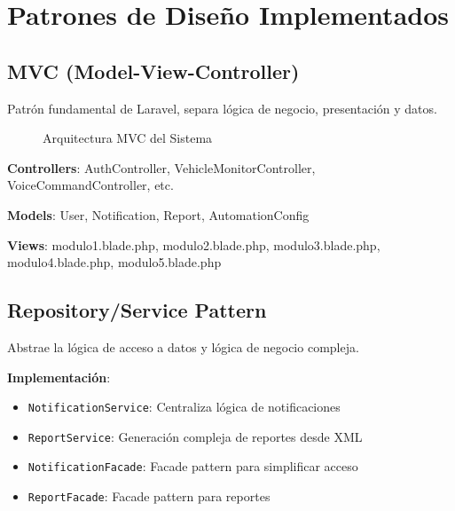 \newpage

\section{Patrones de Diseño Implementados}

\subsection{MVC (Model-View-Controller)}

Patrón fundamental de Laravel, separa lógica de negocio, presentación y datos.

\begin{figure}[H]
\centering
{}
\caption{Arquitectura MVC del Sistema}
\end{figure}

\textbf{Controllers}: AuthController, VehicleMonitorController, VoiceCommandController, etc.

\textbf{Models}: User, Notification, Report, AutomationConfig

\textbf{Views}: modulo1.blade.php, modulo2.blade.php, modulo3.blade.php, modulo4.blade.php, modulo5.blade.php

\subsection{Repository/Service Pattern}

Abstrae la lógica de acceso a datos y lógica de negocio compleja.

\textbf{Implementación}:

\begin{itemize}
    \item \texttt{NotificationService}: Centraliza lógica de notificaciones
    \item \texttt{ReportService}: Generación compleja de reportes desde XML
    \item \texttt{NotificationFacade}: Facade pattern para simplificar acceso
    \item \texttt{ReportFacade}: Facade pattern para reportes
\end{itemize}

